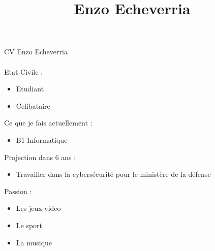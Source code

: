\documentclass[12pt,oneside,a4paper]{article}
\begin{document}
\title{Enzo Echeverria}
CV Enzo Echeverria

\paragraph{}

Etat Civile :
\begin{itemize}
\item Etudiant
\item Celibataire
\end{itemize}

Ce que je fais actuellement :
\begin{itemize}
\item  B1 Informatique
\end{itemize}

Projection dans 6 ans  :
\begin{itemize}
\item Travailler dans la cybersécurité pour le ministère de la défense
\end{itemize}

Passion :
\begin{itemize}
\item Les jeux-video
\item Le sport
\item La musique
\end{itemize}
\end{document}

